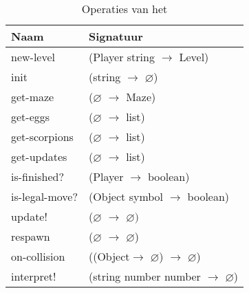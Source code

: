 \begin{table}[hbt]
\centering
\begin{tabular}{|ll|}
\hline
\rowcolor[HTML]{000000} 
{\color[HTML]{FFFFFF} \textbf{Naam}} & {\color[HTML]{FFFFFF} \textbf{Signatuur}} \\ \hline
new-level      & (Player string $\rightarrow$ Level)   \\ \hline
init           & (string $\rightarrow$ $\varnothing$)                      \\ \hline
get-maze       & ($\varnothing$ $\rightarrow$ Maze)                        \\ \hline
get-eggs       & ($\varnothing$ $\rightarrow$ list)                        \\ \hline
get-scorpions  & ($\varnothing$ $\rightarrow$ list)                        \\ \hline
get-updates    & ($\varnothing$ $\rightarrow$ list)                        \\ \hline
is-finished?   & (Player $\rightarrow$ boolean)                            \\ \hline
is-legal-move? & (Object\footnotemark{} symbol $\rightarrow$ boolean)      \\ \hline
update!        & ($\varnothing$ $\rightarrow$ $\varnothing)$               \\ \hline
respawn        & ($\varnothing$ $\rightarrow$ $\varnothing$)               \\ \hline
on-collision   & ((Object\footnotemark[\value{footnote}] $\rightarrow$ $\varnothing$) $\rightarrow$ $\varnothing$) \\ \hline
interpret!     & (string number number $\rightarrow$ $\varnothing$)        \\ \hline
\end{tabular}
\caption{Operaties van het \texttt{}}
\label{table:level}
\end{table}


